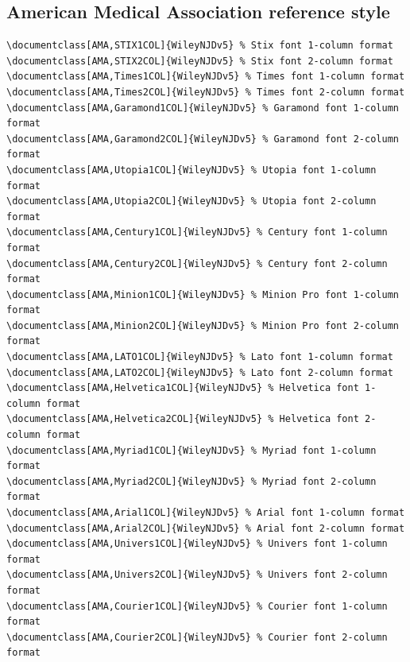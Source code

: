 \documentclass[11pt]{article}
\begin{document}
\subsection*{American Medical Association reference style}
{\fontsize{9}{10}\selectfont\begin{verbatim}
\documentclass[AMA,STIX1COL]{WileyNJDv5} % Stix font 1-column format
\documentclass[AMA,STIX2COL]{WileyNJDv5} % Stix font 2-column format
\documentclass[AMA,Times1COL]{WileyNJDv5} % Times font 1-column format
\documentclass[AMA,Times2COL]{WileyNJDv5} % Times font 2-column format
\documentclass[AMA,Garamond1COL]{WileyNJDv5} % Garamond font 1-column format
\documentclass[AMA,Garamond2COL]{WileyNJDv5} % Garamond font 2-column format
\documentclass[AMA,Utopia1COL]{WileyNJDv5} % Utopia font 1-column format
\documentclass[AMA,Utopia2COL]{WileyNJDv5} % Utopia font 2-column format
\documentclass[AMA,Century1COL]{WileyNJDv5} % Century font 1-column format
\documentclass[AMA,Century2COL]{WileyNJDv5} % Century font 2-column format
\documentclass[AMA,Minion1COL]{WileyNJDv5} % Minion Pro font 1-column format
\documentclass[AMA,Minion2COL]{WileyNJDv5} % Minion Pro font 2-column format
\documentclass[AMA,LATO1COL]{WileyNJDv5} % Lato font 1-column format
\documentclass[AMA,LATO2COL]{WileyNJDv5} % Lato font 2-column format
\documentclass[AMA,Helvetica1COL]{WileyNJDv5} % Helvetica font 1-column format
\documentclass[AMA,Helvetica2COL]{WileyNJDv5} % Helvetica font 2-column format
\documentclass[AMA,Myriad1COL]{WileyNJDv5} % Myriad font 1-column format
\documentclass[AMA,Myriad2COL]{WileyNJDv5} % Myriad font 2-column format
\documentclass[AMA,Arial1COL]{WileyNJDv5} % Arial font 1-column format
\documentclass[AMA,Arial2COL]{WileyNJDv5} % Arial font 2-column format
\documentclass[AMA,Univers1COL]{WileyNJDv5} % Univers font 1-column format
\documentclass[AMA,Univers2COL]{WileyNJDv5} % Univers font 2-column format
\documentclass[AMA,Courier1COL]{WileyNJDv5} % Courier font 1-column format
\documentclass[AMA,Courier2COL]{WileyNJDv5} % Courier font 2-column format
\end{verbatim}}
\end{document}
